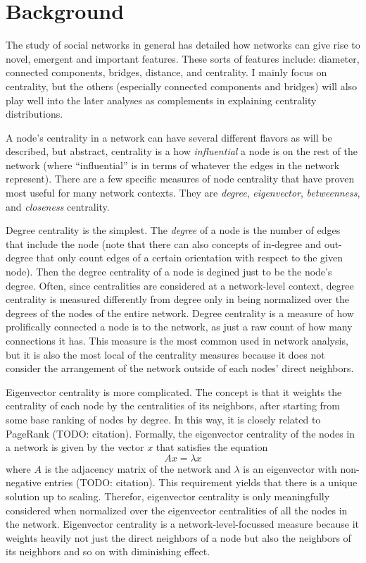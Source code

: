 \documentclass{article}
\renewcommand{\it}{\textit}
\begin{document}
\section{Background}

The study of social networks in general has detailed how networks can give rise to novel, emergent and important features.
These sorts of features include: diameter, connected components, bridges, distance, and centrality.
I mainly focus on centrality, but the others (especially connected components and bridges) will also play well into the later analyses as complements in explaining centrality distributions.

A node's centrality in a network can have several different flavors as will be described, but abstract, centrality is a how \it{influential} a node is on the rest of the network (where ``influential'' is in terms of whatever the edges in the network represent).
There are a few specific measures of node centrality that have proven most useful for many network contexts.
They are \it{degree}, \it{eigenvector}, \it{betweenness}, and \it{closeness} centrality.

Degree centrality is the simplest.
The \it{degree} of a node is the number of edges that include the node (note that there can also concepts of in-degree and out-degree that only count edges of a certain orientation with respect to the given node).
Then the degree centrality of a node is degined just to be the node's degree.
Often, since centralities are considered at a network-level context, degree centrality is measured differently from degree only in being normalized over the degrees of the nodes of the entire network.
Degree centrality is a measure of how prolifically connected a node is to the network, as just a raw count of how many connections it has.
This measure is the most common used in network analysis, but it is also the most local of the centrality measures because it does not consider the arrangement of the network outside of each nodes' direct neighbors.

Eigenvector centrality is more complicated.
The concept is that it weights the centrality of each node by the centralities of its neighbors, after starting from some base ranking of nodes by degree.
In this way, it is closely related to PageRank (TODO: citation).
Formally, the eigenvector centrality of the nodes in a network is given by the vector $x$ that satisfies the equation $$ A x = \lambda x $$ where $A$ is the adjacency matrix of the network and $\lambda$ is an eigenvector with non-negative entries (TODO: citation).
This requirement yields that there is a unique solution up to scaling. Therefor, eigenvector centrality is only meaningfully considered when normalized over the eigenvector centralities of all the nodes in the network.
Eigenvector centrality is a network-level-focussed measure because it weights heavily not just the direct neighbors of a node but also the neighbors of its neighbors and so on with diminishing effect.
\end{document}
